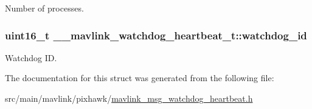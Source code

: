 Number of processes. 

\hypertarget{struct____mavlink__watchdog__heartbeat__t_a0e5537342f2663091c7157206c9790f1}{
\subsubsection[{watchdog\+\_\+id}]{\setlength{\rightskip}{0pt plus 5cm}uint16\+\_\+t \+\_\+\+\_\+mavlink\+\_\+watchdog\+\_\+heartbeat\+\_\+t\+::watchdog\+\_\+id}}\label{struct____mavlink__watchdog__heartbeat__t_a0e5537342f2663091c7157206c9790f1}


Watchdog I\+D. 



The documentation for this struct was generated from the following file\+:\begin{DoxyCompactItemize}
\item 
src/main/mavlink/pixhawk/\hyperlink{mavlink__msg__watchdog__heartbeat_8h}{mavlink\+\_\+msg\+\_\+watchdog\+\_\+heartbeat.\+h}\end{DoxyCompactItemize}
